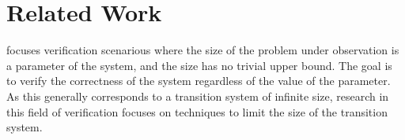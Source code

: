 \section{Related Work}





 focuses verification scenarious where the size of the problem under observation is a parameter of the system, and the size has no trivial upper bound. The goal is to verify the correctness of the system regardless of the value of the parameter. As this generally corresponds to a transition system of infinite size, research in this field of verification focuses on techniques to limit the size of the transition system.

